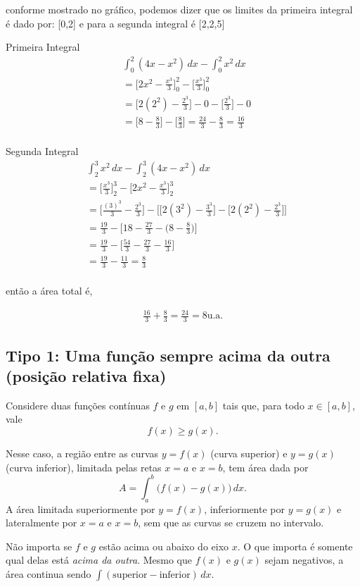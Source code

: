 \begin{exercicio}
  conforme mostrado no gráfico, podemos dizer que os limites da primeira integral é dado por: [0,2] e para a segunda integral é [2,2,5]

  Primeira Integral
  \begin{align*}
    &\int_{0}^{2} (4x-x^2)\,dx-\int_{0}^{2}x^2\,dx\\
    &=\Bigg[2x^2-\frac{x^3}{3}\Bigg]_0^2-\Bigg[\frac{x^3}{3}\Bigg]_0^2\\
    &=\Bigg[2(2^2)-\frac{2^3}{3}\Bigg]-0-\Bigg[\frac{2^3}{3}\Bigg]-0\\
    &=\Bigg[8-\frac{8}{3}\Bigg]-\Bigg[\frac{8}{3}\Bigg]=\frac{24}{3}-\frac{8}{3}=\boxed{\frac{16}{3}}\\
  \end{align*}

  Segunda Integral
  \begin{align*}
    & \int_{2}^{3}x^2\,dx-\int_{2}^{3}(4x-x^2)\,dx\\
    &=\Bigg[\frac{x^3}{3}\Bigg]_2^{3}-\Bigg[2x^2-\frac{x^3}{3}\Bigg]_2^{3}\\
    & =\Bigg[\frac{(3)^3}{3}-\frac{2^3}{3}\Bigg]-
    \Bigg[\Big[2({3}^2)-\frac{3^3}{3}\Big]-\Big[2({2}^2)-\frac{2^3}{3}\Big]\Bigg]\\
    &=\frac{19}{3}-\Big[18-\frac{27}{3}-\Big(8-\frac{8}{3}\Big)\Big]\\
    &=\frac{19}{3}-\Big[\frac{54}{3}-\frac{27}{3}-\frac{16}{3}\Big]\\
    &=\frac{19}{3}-\frac{11}{3}=\frac{8}{3}\\
  \end{align*}
  
  então a área total é,

  \begin{align*}
    \frac{16}{3}+\frac{8}{3}=\frac{24}{3}=\boxed{8\text{u.a.}}
  \end{align*}
\end{exercicio}

\subsection{Tipo 1: Uma função sempre acima da outra (posição relativa fixa)}
Considere duas funções contínuas \(f\) e \(g\) em \([a,b]\) tais que, para todo \(x\in[a,b]\), vale
\[
f(x)\ge g(x).
\]
\begin{example}
  

Nesse caso, a região entre as curvas \(y=f(x)\) (curva superior) e \(y=g(x)\) (curva inferior), limitada pelas retas \(x=a\) e \(x=b\), tem área dada por
\[
A=\int_a^b \big(f(x)-g(x)\big)\,dx.
\]
A área limitada superiormente por \(y=f(x)\), inferiormente por \(y=g(x)\) e lateralmente por \(x=a\) e \(x=b\), sem que as curvas se cruzem no intervalo.

Não importa se \(f\) e \(g\) estão acima ou abaixo do eixo \(x\). O que importa é somente qual delas está \emph{acima da outra}. Mesmo que \(f(x)\) e \(g(x)\) sejam negativos, a área continua sendo \(\int ( \text{superior} - \text{inferior})\,dx\).
\end{example}

